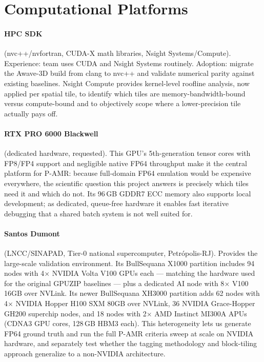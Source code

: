 \documentclass[12pt,a4paper]{article}
\newcommand{\pamr}{P\nobreakdash-AMR}
\begin{document}
\section{Computational Platforms}

\paragraph{HPC SDK} (nvc++/nvfortran, CUDA-X math libraries, Nsight
Systems/Compute). Experience: team uses CUDA and Nsight Systems routinely.
Adoption: migrate the Awave-3D build from clang to nvc++ and validate numerical
parity against existing baselines. Nsight Compute provides kernel-level roofline
analysis, now applied per spatial tile, to identify which tiles are
memory-bandwidth-bound versus compute-bound and to objectively scope where a
lower-precision tile actually pays off.

\paragraph{RTX PRO 6000 Blackwell} (dedicated hardware, requested). This GPU's
5th-generation tensor cores with FP8/FP4 support and negligible native FP64
throughput make it the central platform for \pamr{}: because full-domain FP64
emulation would be expensive everywhere, the scientific question this project
answers is precisely which tiles need it and which do not. Its 96\,GB GDDR7 ECC
memory also supports local development; as dedicated, queue-free hardware it
enables fast iterative debugging that a shared batch system is not well suited
for.

\paragraph{Santos Dumont} (LNCC/SINAPAD, Tier-0 national supercomputer,
Petr\'opolis-RJ). Provides the large-scale validation environment. Its
BullSequana X1000 partition includes 94 nodes with 4$\times$ NVIDIA Volta V100
GPUs each --- matching the hardware used for the original GPUZIP baselines ---
plus a dedicated AI node with 8$\times$ V100 16GB over NVLink. Its newer
BullSequana XH3000 partition adds 62 nodes with 4$\times$ NVIDIA Hopper H100 SXM
80GB over NVLink, 36 NVIDIA Grace-Hopper GH200 superchip nodes, and 18 nodes
with 2$\times$ AMD Instinct MI300A APUs (CDNA3 GPU cores, 128\,GB HBM3 each).
This heterogeneity lets us generate FP64 ground truth and run the full \pamr{}
criteria sweep at scale on NVIDIA hardware, and separately test whether the
tagging methodology and block-tiling approach generalize to a non-NVIDIA
architecture.
\end{document}

